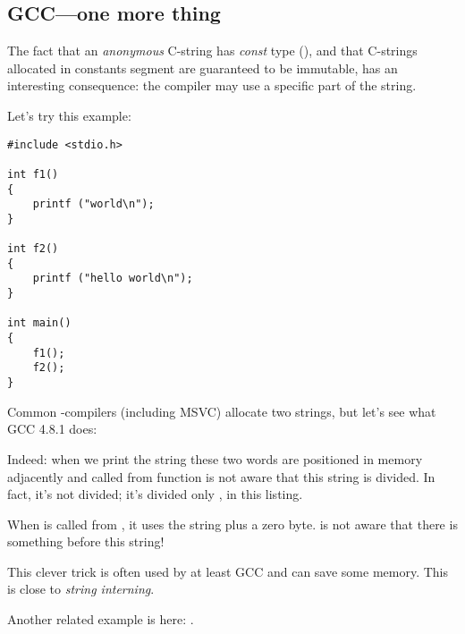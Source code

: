 \subsection{GCC---one more thing}
\label{use_parts_of_C_strings}

The fact that an \emph{anonymous} C-string has \emph{const} type (), 
and that C-strings allocated in constants segment are guaranteed to be immutable, has an interesting consequence:
the compiler may use a specific part of the string.

Let's try this example:

\begin{lstlisting}[style=customc]
#include <stdio.h>

int f1()
{
	printf ("world\n");
}

int f2()
{
	printf ("hello world\n");
}

int main()
{
	f1();
	f2();
}
\end{lstlisting}

Common \CCpp{}-compilers (including MSVC) allocate two strings, but let's see what GCC 4.8.1 does:



Indeed: when we print the  string
these two words are positioned in memory adjacently and \puts called from 
function is not aware that this string is divided. 
In fact, it's not divided; it's divided only , in this listing.

When \puts is called from , it uses the  string plus a zero byte. \puts is not aware that there is something before this string!

This clever trick is often used by at least GCC and can save some memory.
This is close to \emph{string interning}.

Another related example is here: .

